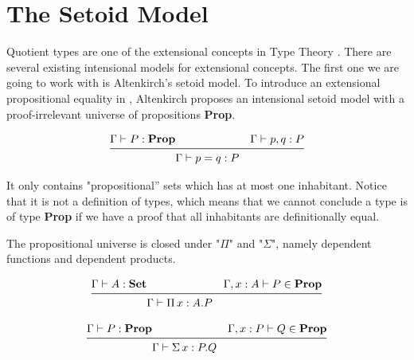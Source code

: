\chapter{The Setoid Model}
\label{sm}


Quotient types are one of the extensional concepts in Type Theory \cite{hof:phd}. There are several existing intensional models for extensional
concepts. The first one we are going to work with is Altenkirch's
setoid model. To introduce an extensional propositional equality in \itt{}, 
Altenkirch \cite{alti:lics99} proposes an intensional setoid model
with a proof-irrelevant universe of propositions \textbf{Prop}.


\begin{equation}[proof-irr]
\begin{aligned}
\Gamma \vdash P : \textbf{Prop} & & \Gamma \vdash p,q : P & \\
\midrule
& \Gamma \vdash p=q : P & \\
\end{aligned}
\end{equation}

It only contains "propositional'' sets which has at most one
inhabitant. Notice that it is not a definition of types, which means
that we cannot conclude a type is of type \textbf{Prop} if we have a
proof that all
inhabitants are definitionally equal.

The propositional universe is closed under "$\Pi$" and "$\Sigma$", namely dependent functions
and dependent products.

\begin{equation}[\Pi-Prop]
\begin{aligned}
\Gamma \vdash A : \textbf{Set} & & \Gamma,x : A \vdash P \in \textbf{Prop} & \\
\midrule
& \Gamma \vdash \Pi\, x : A.P & \\
\end{aligned}
\end{equation}



\begin{equation}[\Sigma-Prop]
\begin{aligned}
\Gamma \vdash P : \textbf{Prop} & & \Gamma,x : P \vdash Q \in \textbf{Prop} & \\
\midrule
& \Gamma \vdash \Sigma\, x : P.Q & \\
\end{aligned}
\end{equation}




